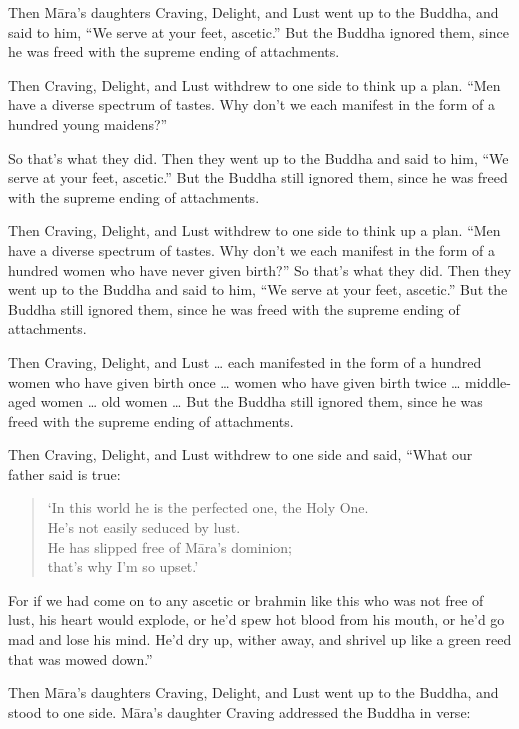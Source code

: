 \documentclass[12pt,openany]{book}%
\begin{document}
Then \textsanskrit{Māra}’s daughters Craving, Delight, and Lust went up to the Buddha, and said to him, “We serve at your feet, ascetic.” But the Buddha ignored them, since he was freed with the supreme ending of attachments. 

Then Craving, Delight, and Lust withdrew to one side to think up a plan. “Men have a diverse spectrum of tastes. Why don’t we each manifest in the form of a hundred young maidens?” 

So that’s what they did. Then they went up to the Buddha and said to him, “We serve at your feet, ascetic.” But the Buddha still ignored them, since he was freed with the supreme ending of attachments. 

Then Craving, Delight, and Lust withdrew to one side to think up a plan. “Men have a diverse spectrum of tastes. Why don’t we each manifest in the form of a hundred women who have never given birth?” So that’s what they did. Then they went up to the Buddha and said to him, “We serve at your feet, ascetic.” But the Buddha still ignored them, since he was freed with the supreme ending of attachments. 

Then Craving, Delight, and Lust … each manifested in the form of a hundred women who have given birth once … women who have given birth twice … middle-aged women … old women … But the Buddha still ignored them, since he was freed with the supreme ending of attachments. 

Then Craving, Delight, and Lust withdrew to one side and said, “What our father said is true: 

\begin{verse}%
‘In this world he is the perfected one, the Holy One. \\
He’s not easily seduced by lust. \\
He has slipped free of \textsanskrit{Māra}’s dominion; \\
that’s why I’m so upset.’ 

%
\end{verse}

For if we had come on to any ascetic or brahmin like this who was not free of lust, his heart would explode, or he’d spew hot blood from his mouth, or he’d go mad and lose his mind. He’d dry up, wither away, and shrivel up like a green reed that was mowed down.” 

Then \textsanskrit{Māra}’s daughters Craving, Delight, and Lust went up to the Buddha, and stood to one side. \textsanskrit{Māra}’s daughter Craving addressed the Buddha in verse: 
\end{document}
